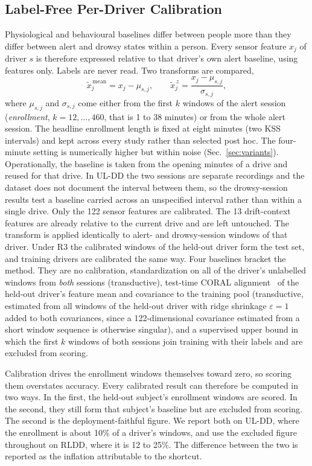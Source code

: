 \documentclass[journal]{IEEEtran}
\newcommand{\rthree}{R3}
\begin{document}
\subsection{Label-Free Per-Driver Calibration}
\label{sec:calibration}
Physiological and behavioural baselines differ between people more than they
differ between alert and drowsy states within a person. Every sensor feature
$x_j$ of driver $s$ is therefore expressed relative to that driver's own alert
baseline, using features only. Labels are never read. Two transforms are
compared,
\begin{equation}
\tilde{x}^{\,\mathrm{mean}}_{j}=x_{j}-\mu_{s,j},
\qquad
\tilde{x}^{\,z}_{j}=\frac{x_{j}-\mu_{s,j}}{\sigma_{s,j}},
\label{eq:cal}
\end{equation}
where $\mu_{s,j}$ and $\sigma_{s,j}$ come either from the first $k$ windows of
the alert session (\emph{enrollment}, $k=12,\dots,460$, that is 1 to 38
minutes) or from the whole alert session. The headline enrollment length is
fixed at eight minutes (two KSS intervals) and kept across every study rather
than selected post hoc. The four-minute setting is numerically higher but
within noise (Sec.~\ref{sec:variants}). Operationally, the baseline is taken
from the opening minutes of a drive and reused for that drive. In UL-DD the
two sessions are separate recordings and the dataset does not document the
interval between them, so the drowsy-session results test a baseline carried
across an unspecified interval rather than within a single drive. Only the 122 sensor features are calibrated. The 13
drift-context features are already relative to the current drive and are left
untouched. The transform is applied identically to alert- and drowsy-session
windows of that driver. Under \rthree{} the calibrated windows of the held-out
driver form the test set, and training drivers are calibrated the same way.
Four baselines bracket the method. They are no calibration, standardization on
all of the driver's unlabelled windows from \emph{both} sessions
(transductive), test-time CORAL alignment~\cite{sun2016coral} of the held-out
driver's feature mean and covariance to the training pool (transductive,
estimated from all windows of the held-out driver with ridge shrinkage
$\varepsilon = 1$ added to both covariances, since a 122-dimensional covariance
estimated from a short window sequence is otherwise singular), and
a supervised upper bound in which the first $k$ windows of both sessions join
training with their labels and are excluded from scoring.

Calibration drives the enrollment windows themselves toward zero, so scoring
them overstates accuracy. Every calibrated result can therefore be computed in
two ways. In the first, the held-out subject's enrollment windows are scored.
In the second, they still form that subject's baseline but are excluded from
scoring. The second is the deployment-faithful figure. We report both on
UL-DD, where the enrollment is about 10\% of a driver's windows, and use the
excluded figure throughout on RLDD, where it is 12 to 25\%. The difference
between the two is reported as the inflation attributable to the shortcut.
\end{document}

